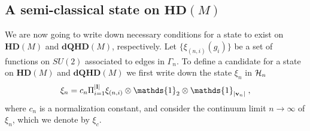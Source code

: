 \documentclass[12pt]{article}
\def\G{\Gamma}
\def\P{\Pi}
\def\ca{{\cal A}}
\def\ch{{\cal H}}
\begin{document}
\subsection{A semi-classical state on $\mathbf{HD}(M)$}


We are now going to write down necessary conditions for a state to exist on $\mathbf{HD}(M)$ and $\mathbf{dQHD}(M)$, respectively.
%
Let $\{\xi_{(n,i)}(g_i)\}$ be a set of functions on $SU(2)$ associated to edges in $\G_n$.
To define a candidate for a state on $\mathbf{HD}(M)$ and $\mathbf{dQHD}(M)$ we first write down the state $\xi_n$ in $\ch_n$ 
\begin{equation}
\xi_n =  c_n \P_{i=1}^{\vert {\bf l}\vert} \xi_{(n,i)}\otimes \mathds{1}_2\otimes \mathds{1}_{\vert {\bf v}_n\vert }\;,
\label{state-semi}
\end{equation}
where $c_n$ is a normalization constant, and consider the continuum limit $n\rightarrow\infty$ of $\xi_n$, which
we denote by $\xi_c$.
\end{document}
